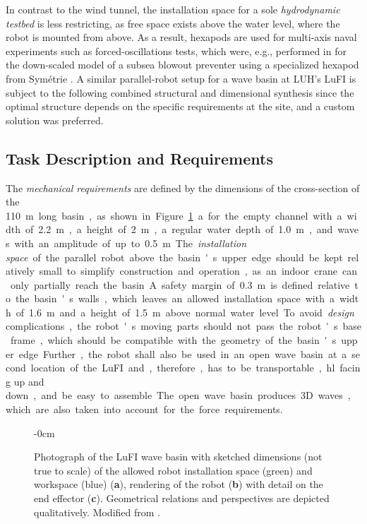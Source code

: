 In contrast to the wind tunnel, the installation space for a sole \emph{hydrodynamic testbed} is less restricting, as free space exists above the water level, where the robot is mounted from above.
As a result, hexapods are used for multi-axis naval experiments such as forced-oscillations tests, which were, e.g., performed in \cite{ArinoWilRusGry2015} for the down-scaled model of a subsea blowout preventer using a specialized hexapod from Symétrie \cite{SymetrieHexapods}.
A similar parallel-robot setup for a wave basin %
%
%
at LUH's LuFI is subject to the following combined structural and dimensional synthesis since the optimal structure depends on the specific requirements at the site, and a custom solution was preferred.

\subsection{Task Description and Requirements}
\label{sec:eval_lufi_task}

The \emph{mechanical requirements} are defined by the dimensions of the cross-section of the \SI{110} m long basin, as shown in Figure~\ref{fig:lufipkm_task}a for the empty channel with a width of \SI{2.2} m, a height of \SI{2} m, a regular water depth of \SI{1.0} m, and waves with an amplitude of up to \SI{0.5} m.
The \emph{installation space} of the parallel robot above the basin's upper edge should be kept relatively small to simplify construction and operation, as an indoor crane can only partially reach the basin.
A safety margin of \SI{0.3} m is defined relative to the basin's walls, which leaves an allowed installation space with a width of \SI{1.6} m and a height of \SI{1.5} m above normal water level.
To avoid \emph{design} complications, the robot's moving parts should not pass the robot's base frame, which should be compatible with the geometry of the basin's upper edge.
Further, the robot shall also be used in an open wave basin at a second location of the LuFI and, therefore, has to be transportable, \hl{facing up and down}, and {be} easy to assemble. %
The open wave basin produces 3D waves, which are also taken into account for the force requirements.

\begin{figure}[H]
  \begin{adjustwidth}{-\extralength}{0cm}
    \centering
    \graphicspath{{Figures/}}
    
  \end{adjustwidth}
  \caption[Wave basin, robot and ship model for the naval-testbed task]{Photograph of the LuFI wave basin with sketched dimensions (not true to scale) of the allowed robot installation space (green) and workspace (blue) (\textbf{a}), rendering of the robot (\textbf{b}) with detail on the end effector (\textbf{c}). Geometrical relations and perspectives are depicted qualitatively. Modified from \cite{Fettin2023_M1174}.}
  \label{fig:lufipkm_task}
\end{figure}


